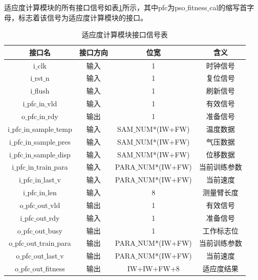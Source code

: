 适应度计算模块的所有接口信号如表\ref{tab:适应度计算模块接口信号表}所示，其中pfc为pso$\_$fitness$\_$cal的缩写首字母，标志着该信号为适应度计算模块的接口。
\begin{table}[htb]
    \centering
    \caption{适应度计算模块接口信号表}
    \label{tab:适应度计算模块接口信号表}
    \begin{tabular}{c|c|c|c}
        \hline
        接口名                               & 接口方向  & 位宽               &含义                        \\ \hline
        i$\_$clk                            & 输入      & 1                     & 时钟信号             \\ \hline
        i$\_$rst$\_$n                       & 输入      & 1                     & 复位信号             \\ \hline
        i$\_$flush                          & 输入      & 1                     & 刷新信号             \\ \hline
        i$\_$pfc$\_$in$\_$vld               & 输入      & 1                     & 有效信号        \\ \hline
        o$\_$pfc$\_$in$\_$rdy               & 输出      & 1                     & 准备信号        \\ \hline
        i$\_$pfc$\_$in$\_$sample$\_$temp    & 输入      & SAM$\_$NUM*(IW+FW)    & 温度数据        \\ \hline
        i$\_$pfc$\_$in$\_$sample$\_$pres    & 输入      & SAM$\_$NUM*(IW+FW)    & 气压数据        \\ \hline
        i$\_$pfc$\_$in$\_$sample$\_$disp    & 输入      & SAM$\_$NUM*(IW+FW)    & 位移数据        \\ \hline
        i$\_$pfc$\_$in$\_$train$\_$para     & 输入      & PARA$\_$NUM*(IW+FW)   & 当前训练参数     \\ \hline
        i$\_$pfc$\_$in$\_$last$\_$v         & 输入      & PARA$\_$NUM*(IW+FW)   & 当前速度        \\ \hline
        i$\_$pfc$\_$in$\_$len               & 输入      & 8                     & 测量臂长度      \\ \hline
        o$\_$pfc$\_$out$\_$vld              & 输出      & 1                     & 有效信号        \\ \hline
        i$\_$pfc$\_$out$\_$rdy              & 输入      & 1                     & 准备信号        \\ \hline
        o$\_$pfc$\_$out$\_$busy             & 输出      & 1                     & 工作标志位            \\ \hline
        o$\_$pfc$\_$out$\_$train$\_$para    & 输出      & PARA$\_$NUM*(IW+FW)   & 当前训练参数     \\ \hline
        o$\_$pfc$\_$out$\_$last$\_$v        & 输出      & PARA$\_$NUM*(IW+FW)   & 当前速度         \\ \hline
        o$\_$pfc$\_$out$\_$fitness          & 输出      & IW+IW+FW+8            & 适应度结果       \\ \hline
    \end{tabular}
  \end{table}

